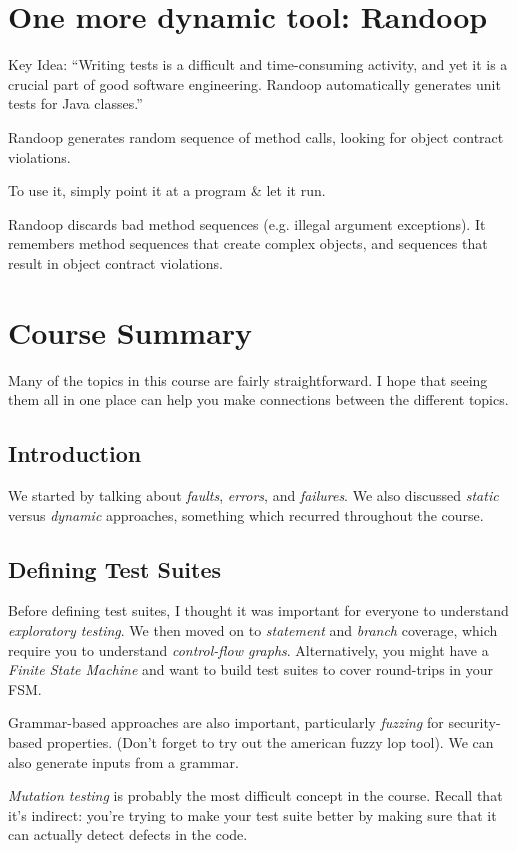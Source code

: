\documentclass[11pt]{article}
\begin{document}
{\section*{One more dynamic tool: Randoop}
    Key Idea:
    ``Writing tests is a difficult and time-consuming activity, 
  and yet it is a crucial part of good software engineering. 
  Randoop automatically generates unit tests for Java classes.''

  Randoop generates random sequence of method calls, 
  looking for object contract violations.
  
  To use it, simply point it at a program \& let it run.

  Randoop discards bad method sequences 
(e.g. illegal argument exceptions). It remembers method sequences that create complex objects,
    and sequences that result in object contract violations.

\section*{Course Summary}
Many of the topics in this course are fairly straightforward. I hope that seeing them
all in one place can help you make connections between the different topics.

\subsection*{Introduction}
We started by talking about \emph{faults}, \emph{errors}, and \emph{failures}.
We also discussed \emph{static} versus \emph{dynamic} approaches, something which recurred
throughout the course. 

\subsection*{Defining Test Suites}
Before defining test suites, I thought it was important for everyone to understand
\emph{exploratory testing}. We then moved on to \emph{statement} and \emph{branch}
coverage, which require you to understand \emph{control-flow graphs}. Alternatively,
you might have a \emph{Finite State Machine} and want to build test suites to cover
round-trips in your FSM.

Grammar-based approaches are also important, particularly \emph{fuzzing} for security-based
properties. (Don't forget to try out the american fuzzy lop tool). We can also generate
inputs from a grammar.

\emph{Mutation testing} is probably the most difficult concept in the course. Recall that
it's indirect: you're trying to make your test suite better by making sure that it can actually
detect defects in the code.

}
\end{document}
